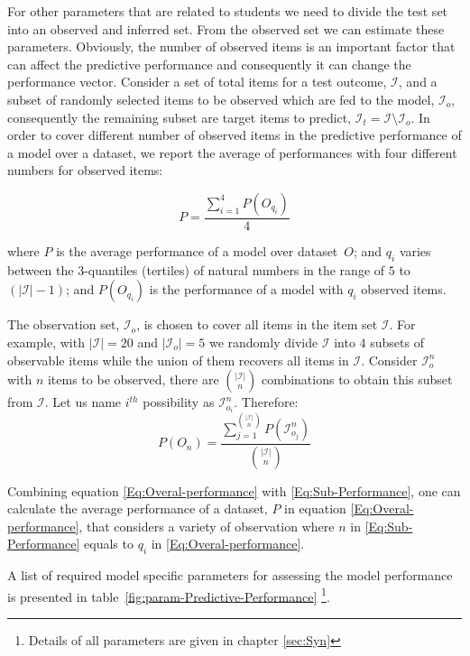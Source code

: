 For other parameters that are related to students we need to divide the test set into an observed and inferred set. From the observed set we can estimate these parameters. Obviously, the number of observed items is an important factor that can affect the predictive performance and consequently it can change the performance vector. Consider a set of total items for a test outcome, $\mathcal{I}$, and a subset of randomly selected items to be observed which are fed to the model, $\mathcal{I}_o$, consequently the remaining subset are target items to predict, $\mathcal{I}_t = \mathcal{I}\setminus\mathcal{I}_o$. In order to cover different number of observed items in the predictive performance of a model over a dataset, we report the average of performances with four different numbers for observed items:

\begin{equation}
P = \frac{\sum_{i = 1}^{4}{P(O_{q_i})}}{4}
\label{Eq:Overal-performance}
\end{equation} 

 where $P$ is the average performance of a model over dataset~$O$; and $q_i$ varies between the 3-quantiles (tertiles) of natural numbers in the range of $5$ to $(|\mathcal{I}|-1)$; and $P(O_{q_i})$ is the performance of a model with $q_i$ observed items.

The observation set, $\mathcal{I}_o$, is chosen to cover all items in the item set $\mathcal{I}$. For example, with $|\mathcal{I}| = 20$ and  $|\mathcal{I}_o| = 5$ we randomly divide $\mathcal{I}$ into $4$ subsets of observable items while the union of them recovers all items in $\mathcal{I}$. Consider $\mathcal{I}_o^n$ with $n$ items to be observed, there are ${|\mathcal{I}|\choose n}$  combinations to obtain this subset from $\mathcal{I}$. Let us name $i^{th}$ possibility as $\mathcal{I}_{o_i}^n$. Therefore:
\begin{equation}
P(O_n) = \frac{\sum_{j = 1}^{|\mathcal{I}|\choose n}{P(\mathcal{I}_{o_j}^n)}}{{|\mathcal{I}|\choose n}}
\label{Eq:Sub-Performance}
\end{equation}

Combining equation \ref{Eq:Overal-performance} with \ref{Eq:Sub-Performance}, one can calculate the average performance of a dataset, $P$ in equation \ref{Eq:Overal-performance}, that considers a variety of observation where $n$ in  \ref{Eq:Sub-Performance} equals to $q_i$ in \ref{Eq:Overal-performance}.

A list of required model specific parameters for assessing the model performance is presented in table~\ref{fig:param-Predictive-Performance} \footnote{Details of all parameters are given in chapter \ref{sec:Syn}}.

